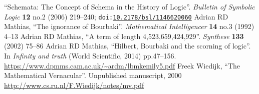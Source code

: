 \documentclass{amsart}
\begin{document}
\begin{thebibliography}{99}
  ``Schemata: The Concept of Schema in the History of Logic''.
  \textit{Bulletin of Symbolic Logic} \textbf{12} no.2 (2006) 219--240;
  \texttt{doi:\href{https://doi.org/10.2178/bsl/1146620060}{10.2178/bsl/1146620060}}
  Adrian RD Mathias,
  ``The ignorance of Bourbaki''.
  \textit{Mathematical Intelligencer} \textbf{14} no.3 (1992) 4--13
  Adrian RD Mathias,
  ``A term of length 4,523,659,424,929''.
  \textit{Synthese} \textbf{133} (2002) 75--86
  Adrian RD Mathias,
  ``Hilbert, Bourbaki and the scorning of logic''.
  In \textit{Infinity and truth} (World Scientific, 2014) pp.47--156.
  \url{https://www.dpmms.cam.ac.uk/~ardm/lbmkemily5.pdf}
  Freek Wiedijk,
  ``The Mathematical Vernacular''.
  Unpublished manuscript, 2000
  \url{http://www.cs.ru.nl/F.Wiedijk/notes/mv.pdf}
\end{thebibliography}
\end{document}

